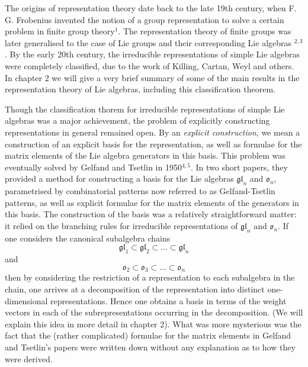 \documentclass{article}[12pt]
\begin{document}
The origins of representation theory date back to the late 19th century, when F. G. Frobenius invented the notion of a group representation to solve a certain problem in finite group theory$^1$. The representation theory of finite groups was later generalised to the case of Lie groups and their corresponding Lie algebras $^{2,3}$. By the early 20th century, the irreducible representations of simple Lie algebras were completely classified, due to the work of Killing, Cartan, Weyl and others. In chapter 2 we will give a very brief summary of some of the main results in the representation theory of Lie algebras, including this classification theorem.

\vspace[0.5]
Though the classification thorem for irreducible representations of simple Lie algebras was a major achievement, the problem of explicitly constructing representations in general remained open. By an \emph{explicit construction}, we mean a construction of an explicit basis for the representation, as well as formulae for the matrix elements of the Lie algebra generators in this basis. This problem was eventually solved by Gelfand and Tsetlin in 1950$^{4,5}$. In two short papers, they provided a method for constructing a basis for the Lie algebras $\mathfrak{gl}_n$ and $\mathfrak{o}_n$, parametrised by combinatorial patterns now referred to as Gelfand-Tsetlin
patterns, as well as explicit formulae for the matrix elements of the generators in this basis. The construction of the basis was a relatively straightforward matter: it relied on the branching rules for irreducible representations of $\mathfrak{gl}_n$ and $\mathfrak{o}_n$. If one considers the canonical subalgebra chains
\[
\mathfrak{gl}_1 \subset \mathfrak{gl}_2 \subset ... \subset \mathfrak{gl}_n
\]
and
\[
\mathfrak{o}_2 \subset \mathfrak{o}_3 \subset ... \subset \mathfrak{o}_n
\]
then by considering the restriction of a representation to each subalgebra in the chain, one arrives at a decomposition of the representation into distinct one-dimensional representations. Hence one obtains a basis in terms of the weight vectors in each of the subrepresentations occurring in the decomposition. (We will explain this idea in more detail in chapter 2). What was more mysterious
was the fact that the (rather complicated) formulae for the matrix elements in Gelfand and Tsetlin's papers were written down without any explanation as to how they were derived.
\end{document}
